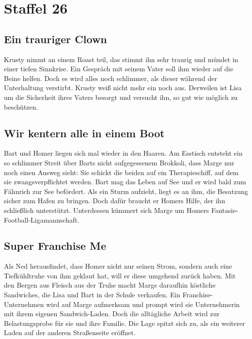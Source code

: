 \section{Staffel 26}

\subsection{Ein trauriger Clown}
Krusty nimmt an einem Roast teil, das stimmt ihn sehr traurig und mündet in einer tiefen Sinnkrise. Ein Gespräch mit seinem Vater soll ihm wieder auf die Beine helfen. Doch es wird alles noch schlimmer, als dieser während der Unterhaltung verstirbt. Krusty weiß nicht mehr ein noch aus. Derweilen ist Lisa um die Sicherheit ihres Vaters besorgt und versucht ihn, so gut wie möglich zu beschützen.


\subsection{Wir kentern alle in einem Boot}
Bart und Homer liegen sich mal wieder in den Haaren. Am Esstisch entsteht ein so schlimmer Streit über Barts nicht aufgegessenem Brokkoli, dass Marge nur noch einen Ausweg sieht: Sie schickt die beiden auf ein Therapieschiff, auf dem sie zwangsverpflichtet werden. Bart mag das Leben auf See und er wird bald zum Fähnrich zur See befördert. Als ein Sturm aufzieht, liegt es an ihm, die Besatzung sicher zum Hafen zu bringen. Doch dafür braucht er Homers Hilfe, der ihn schließlich unterstützt. Unterdessen kümmert sich Marge um Homers Fantasie-Football-Ligamannschaft.


\subsection{Super Franchise Me}\label{SABF19}
Als Ned herausfindet, dass Homer nicht nur seinen Strom, sondern auch eine Tiefkühltruhe von ihm geklaut hat, will er diese umgehend zurück haben. Mit den Bergen aus Fleisch aus der Truhe macht Marge daraufhin köstliche Sandwiches, die Lisa und Bart in der Schule verkaufen. Ein Franchise-Unternehmen wird auf Marge aufmerksam und prompt wird sie Unternehmerin mit ihrem eigenen Sandwich-Laden. Doch die alltägliche Arbeit wird zur Belastungsprobe für sie und ihre Familie. Die Lage spitzt sich zu, als ein weiterer Laden auf der anderen Straßenseite eröffnet.

